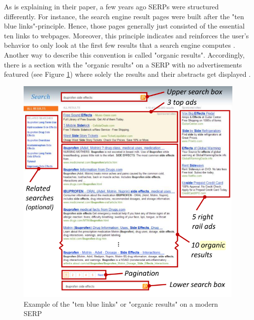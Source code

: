 As \textcite{lewandowski2015evaluating} is explaining in their paper, a few years ago SERPs were structured differently. For instance, the search engine result pages were built after the "ten blue links"-principle. Hence, those pages generally just consisted of the essential ten links to webpages. Moreover, this principle indicates and reinforces the user's behavior to only look at the first few results that a search engine computes \autocite{lewandowski2015evaluating, liu2015influence, wang2016beyond}. Another way to describe this convention is called "organic results". Accordingly, there is a section with the "organic results" on a SERP with no advertisements featured (see Figure \ref{figure:OrganicResults}) where solely the results and their abstracts get displayed \autocite{buscher2010good}.

\begin{figure}[!ht]
    \centering
    \includegraphics[width=1 \linewidth]{images/organic_buscher2010good.png}
    \caption{
        Example of the "ten blue links" or "organic results" on a modern SERP \autocite[3]{buscher2010good}
    }
    \label{figure:OrganicResults}
\end{figure}

